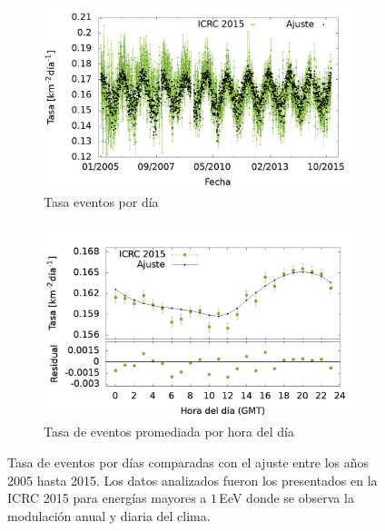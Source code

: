			\begin{figure}[H]
				\begin{subfigure}[b]{0.5\textwidth}
				\includegraphics[width=\textwidth]{Graphs/rate_dayly/1EeV_ICRC_2015.png}
				\caption{Tasa eventos por día}\label{fig:rate_dayly_ICRC_2015}
    			\end{subfigure}%
    			\hspace{\fill}
    			\begin{subfigure}[b]{0.5\textwidth}
				\includegraphics[width=\textwidth]{Graphs/rate_hour_of_the_day/1EeV_ICRC_2015_old_herald.png}
				\caption{Tasa de eventos promediada por hora del día }\label{fig:rate_hod_ICRC_2015}
    			\end{subfigure}%
				\caption{Tasa de eventos por días comparadas con el ajuste entre los años 2005 hasta 2015. Los datos analizados fueron los presentados en la ICRC 2015 para energías mayores a $1\,$EeV donde se observa la modulación anual y diaria del clima. }\label{fig:rate_2015_05-15}
			\end{figure}



